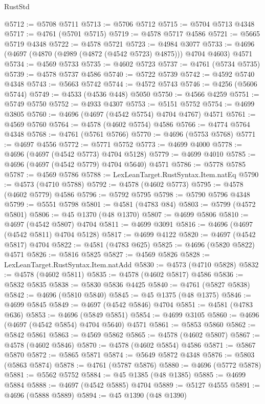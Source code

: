 \begin{lexlean}{RustStd}
\begin{coremodule}
@5712 := @5708 @5711
@5713 := @5706 @5712
@5715 := @5704 @5713 @4348
@5717 := @4761 (@5701 @5715)
@5719 := @4578 @5717 @4586
@5721 := @5665 @5719 @4348
@5722 := @4578 @5721
@5723 := @4984 @3077
@5733 := @4696 (@4697 (@4870 (@4989 (@4872 (@4542 @5723) @4875))) @4704 @4603) @4571
@5734 := @4569 @5733
@5735 := @4602 @5723
@5737 := @4761 (@5734 @5735)
@5739 := @4578 @5737 @4586
@5740 := @5722 @5739
@5742 := @4592 @5740 @4348
@5743 := @5663 @5742
@5744 := @4572 @5743
@5746 := @4256 (@5606 @5744)
@5749 := @4533 (@4536 @448) @5050
@5750 := @4566 @4259
@5751 := @5749 @5750
@5752 := @4933 @4307
@5753 := @5151 @5752
@5754 := @4699 @3805
@5760 := @4696 (@4697 (@4542 @5754) @4704 @4767) @4571
@5761 := @4569 @5760
@5764 := @4578 (@4602 @5754) @4586
@5766 := @4774 @5764 @4348
@5768 := @4761 (@5761 @5766)
@5770 := @4696 (@5753 @5768)
@5771 := @4697 @4556
@5772 := @5771 @5752
@5773 := @4699 @4000
@5778 := @4696 (@4697 (@4542 @5773) @4704 @5128)
@5779 := @4699 @4010
@5785 := @4696 (@4697 (@4542 @5779) @4704 @5640) @4571
@5786 := @5778 @5785
@5787 := @4569 @5786
@5788 := LexLeanTarget.RustSyntax.Item.natEq
@5790 := @4573 (@4710 @5788)
@5792 := @4578 (@4602 @5773)
@5795 := @4578 (@4602 @5779) @4586
@5796 := @5792 @5795
@5798 := @5790 @5796 @4348
@5799 := @5551 @5798
@5801 := @4581 (@4783 @84)
@5803 := @5799 (@4572 @5801)
@5806 := @45 @1370 (@48 @1370)
@5807 := @4699 @5806
@5810 := @4697 (@4542 @5807) @4704
@5811 := @4699 @3091
@5816 := @4696 (@4697 (@4542 @5811) @4704 @5128)
@5817 := @4699 @4122
@5820 := @4697 (@4542 @5817) @4704
@5822 := @4581 (@4783 @625)
@5825 := @4696 (@5820 @5822) @4571
@5826 := @5816 @5825
@5827 := @4569 @5826
@5828 := LexLeanTarget.RustSyntax.Item.natAdd
@5830 := @4573 (@4710 @5828)
@5832 := @4578 (@4602 @5811)
@5835 := @4578 (@4602 @5817) @4586
@5836 := @5832 @5835
@5838 := @5830 @5836 @4425
@5840 := @4761 (@5827 @5838)
@5842 := @4696 (@5810 @5840)
@5845 := @45 @1375 (@48 @1375)
@5846 := @4699 @5845
@5849 := @4697 (@4542 @5846) @4704
@5851 := @4581 (@4783 @636)
@5853 := @4696 (@5849 @5851)
@5854 := @4699 @3105
@5860 := @4696 (@4697 (@4542 @5854) @4704 @5640) @4571
@5861 := @5853 @5860
@5862 := @5842 @5861
@5863 := @4569 @5862
@5865 := @4578 (@4602 @5807)
@5867 := @4578 (@4602 @5846)
@5870 := @4578 (@4602 @5854) @4586
@5871 := @5867 @5870
@5872 := @5865 @5871
@5874 := @5649 @5872 @4348
@5876 := @5803 (@5863 @5874)
@5878 := @4761 (@5787 @5876)
@5880 := @4696 (@5772 @5878)
@5881 := @5562 @5752
@5884 := @45 @1385 (@48 @1385)
@5885 := @4699 @5884
@5888 := @4697 (@4542 @5885) @4704
@5889 := @5127 @4555
@5891 := @4696 (@5888 @5889)
@5894 := @45 @1390 (@48 @1390)

\end{coremodule}
\end{lexlean}
